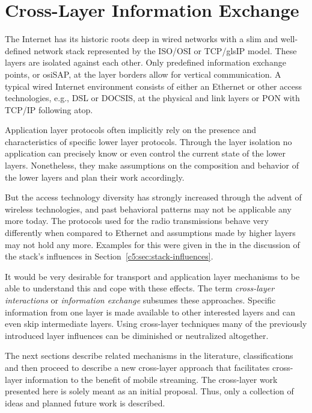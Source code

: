 \section{Cross-Layer Information Exchange}
\label{c5:sec:crosslayerhinting}

The Internet has its historic roots deep in wired networks with a slim and well-defined network stack represented by the \gls{ISO}/\gls{OSI} or \gls{TCP}/gls{IP} model. These layers are isolated against each other. Only predefined information exchange points, or \gls{osiSAP}, at the layer borders allow for vertical communication. A typical wired Internet environment consists of either an Ethernet or other access technologies, e.g., \gls{DSL} or \gls{DOCSIS}, at the physical and link layers or \gls{PON} with \gls{TCP}/\gls{IP} following atop.

Application layer protocols often implicitly rely on the presence and characteristics of specific lower layer protocols. Through the layer isolation no application can precisely know or even control the current state of the lower layers. Nonetheless, they make assumptions on the composition and behavior of the lower layers and plan their work accordingly. 

But the access technology diversity has strongly increased through the advent of wireless technologies, and past behavioral patterns may not be applicable any more today. The protocols used for the radio transmissions behave very differently when compared to Ethernet and assumptions made by higher layers may not hold any more. Examples for this were given in the in the discussion of the stack's influences in Section~\ref{c5:sec:stack-influences}.

It would be very desirable for transport and application layer mechanisms to be able to understand this and cope with these effects. The term \textit{cross-layer interactions} or \textit{information exchange} subsumes these approaches. Specific information from one layer is made available to other interested layers and can even skip intermediate layers. Using cross-layer techniques many of the previously introduced layer influences can be diminished or neutralized altogether.

The next sections describe related mechanisms in the literature, classifications and then proceed to describe a new cross-layer approach that facilitates cross-layer information to the benefit of mobile streaming. The cross-layer work presented here is solely meant as an initial proposal. Thus, only a collection of ideas and planned future work is described.

